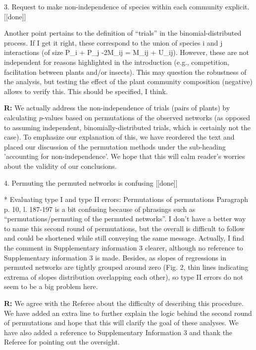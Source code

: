 \documentclass[12pt]{letter}
\newenvironment{refquote}{\bigskip \begin{it}}{\end{it}\smallskip}
\begin{document}
	3. Request to make non-independence of species within each community explicit. [[done]]

		\begin{refquote}
			Another point pertains to the definition of “trials” in the binomial-distributed process. If I get it right, these correspond to the union of species i and j interactions (of size P\_i + P\_j -2M\_ij = M\_ij + U\_ij). However, these are not independent for reasons highlighted in the introduction (e.g., competition, facilitation between plants and/or insects). This may question the robustness of the analysis, but testing the effect of the plant community composition (negative) allows to verify this. This should be specified, I think.
		\end{refquote}


		\textbf{R:} We actually address the non-independence of trials (pairs of plants) by calculating $p$-values based on permutations of the observed networks (as opposed to assuming independent, binomially-distributed trials, which is certainly not the case). To emphasize our explanation of this, we have reordered the text and placed our discussion of the permutation methods under the sub-heading 'accounting for non-independence'. We hope that this will calm reader's worries about the validity of our conclusions.


	4. Permuting the permuted networks is confusing [[done]]

		\begin{refquote}
			* Evaluating type I and type II errors: Permutations of permutations
			Paragraph p. 10, l. 187-197 is a bit confusing because of phrasings such as “permutations/permuting of the permuted networks”. I don't have a better way to name this second round of permutations, but the overall is difficult to follow and could be shortened while still conveying the same message.
			Actually, I find the comment in Supplementary information 3 clearer, although no reference to Supplementary information 3 is made.
			Besides, as slopes of regressions in permuted networks are tightly grouped around zero (Fig. 2, thin lines indicating 
			extrema of slopes distribution overlapping each other), so type II errors do not seem to be a big problem here.
		\end{refquote}


		\textbf{R:} We agree with the Referee about the difficulty of describing this procedure. We have added an extra line to further explain the logic behind the second round of permutations and hope that this will clarify the goal of these analyses. We have also added a reference to Supplementary Information 3 and thank the Referee for pointing out the oversight.
\end{document}
